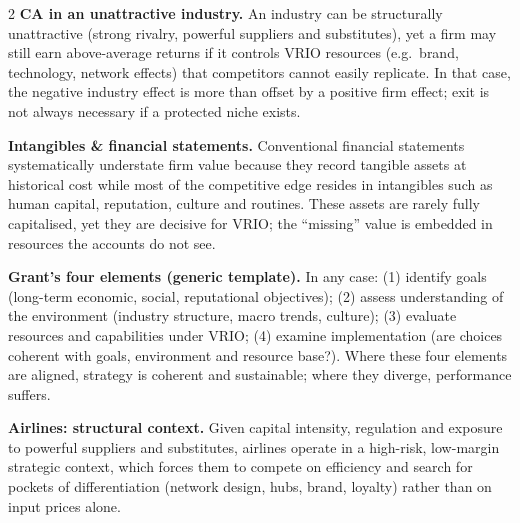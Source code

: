 \documentclass[8pt,landscape,a4paper]{article}
\begin{document}
\begin{multicols}{2}
\textbf{CA in an unattractive industry.} An industry can be structurally unattractive (strong rivalry, powerful suppliers and substitutes), yet a firm may still earn above-average returns if it controls VRIO resources (e.g.\ brand, technology, network effects) that competitors cannot easily replicate. In that case, the negative industry effect is more than offset by a positive firm effect; exit is not always necessary if a protected niche exists.

\textbf{Intangibles \& financial statements.} Conventional financial statements systematically understate firm value because they record tangible assets at historical cost while most of the competitive edge resides in intangibles such as human capital, reputation, culture and routines. These assets are rarely fully capitalised, yet they are decisive for VRIO; the ``missing'' value is embedded in resources the accounts do not see.

\textbf{Grant's four elements (generic template).} In any case: (1) identify goals (long-term economic, social, reputational objectives); (2) assess understanding of the environment (industry structure, macro trends, culture); (3) evaluate resources and capabilities under VRIO; (4) examine implementation (are choices coherent with goals, environment and resource base?). Where these four elements are aligned, strategy is coherent and sustainable; where they diverge, performance suffers.

\textbf{Airlines: structural context.} Given capital intensity, regulation and exposure to powerful suppliers and substitutes, airlines operate in a high-risk, low-margin strategic context, which forces them to compete on efficiency and search for pockets of differentiation (network design, hubs, brand, loyalty) rather than on input prices alone.

\end{multicols}
\end{document}
